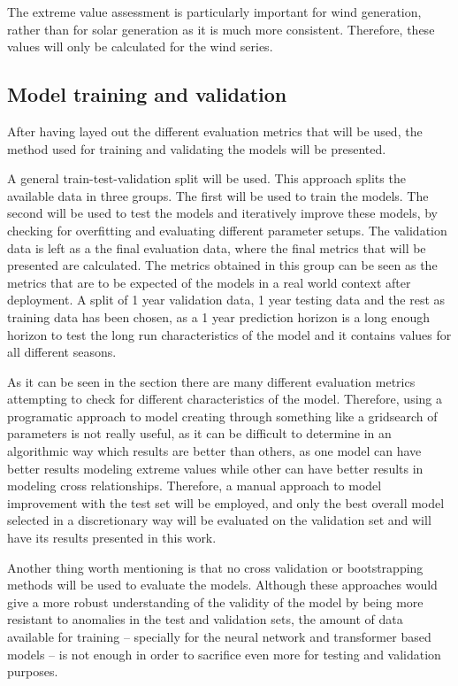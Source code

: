 The extreme value assessment is particularly important for wind generation, rather than for solar generation as it is much more consistent. Therefore, these values will only be calculated for the wind series. 

\subsection{Model training and validation}
After having layed out the different evaluation metrics that will be used, the method used for training and validating the models will be presented. 

A general train-test-validation split will be used. This approach splits the available data in three groups. The first will be used to train the models. The second will be used to test the models and iteratively improve these models, by checking for overfitting and evaluating different parameter setups. The validation data is left as a the final evaluation data, where the final metrics that will be presented are calculated. The metrics obtained in this group can be seen as the metrics that are to be expected of the models in a real world context after deployment. A split of 1 year validation data, 1 year testing data and the rest as training data has been chosen, as a 1 year prediction horizon is a long enough horizon to test the long run characteristics of the model and it contains values for all different seasons. 

As it can be seen in the  section there are many different evaluation metrics attempting to check for different characteristics of the model. Therefore, using a programatic approach to model creating through something like a gridsearch of parameters is not really useful, as it can be difficult to determine in an algorithmic way which results are better than others, as one model can have better results modeling extreme values while other can have better results in modeling cross relationships. Therefore, a manual approach to model improvement with the test set will be employed, and only the best overall model selected in a discretionary way will be evaluated on the validation set and will have its results presented in this work.

Another thing worth mentioning is that no cross validation or bootstrapping methods will be used to evaluate the models. Although these approaches would give a more robust understanding of the validity of the model by being more resistant to anomalies in the test and validation sets, the amount of data available for training -- specially for the neural network and transformer based models -- is not enough in order to sacrifice even more for testing and validation purposes.

